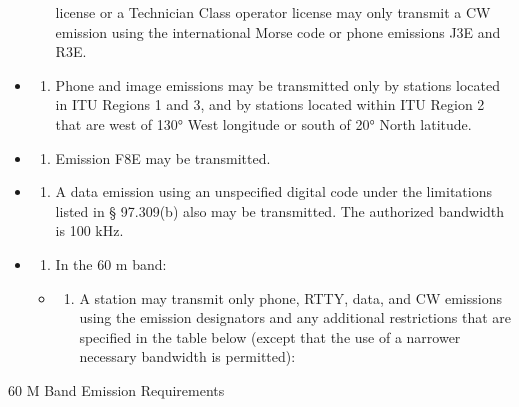 \documentclass[
  letterpaper,
  DIV=11,
  numbers=noendperiod]{scrreport}
\providecommand{\tightlist}{%
  \setlength{\itemsep}{0pt}\setlength{\parskip}{0pt}}\usepackage{longtable,booktabs,array}
\begin{document}
\begin{itemize}
\begin{enumerate}
    license or a Technician Class operator license may only transmit a
    CW emission using the international Morse code or phone emissions
    J3E and R3E.
  \end{enumerate}
\item
  \begin{enumerate}
  \def\labelenumi{(\arabic{enumi})}
  \setcounter{enumi}{10}
  \tightlist
  \item
    Phone and image emissions may be transmitted only by stations
    located in ITU Regions 1 and 3, and by stations located within ITU
    Region 2 that are west of 130° West longitude or south of 20° North
    latitude.
  \end{enumerate}
\item
  \begin{enumerate}
  \def\labelenumi{(\arabic{enumi})}
  \setcounter{enumi}{11}
  \tightlist
  \item
    Emission F8E may be transmitted.
  \end{enumerate}
\item
  \begin{enumerate}
  \def\labelenumi{(\arabic{enumi})}
  \setcounter{enumi}{12}
  \tightlist
  \item
    A data emission using an unspecified digital code under the
    limitations listed in § 97.309(b) also may be transmitted. The
    authorized bandwidth is 100 kHz.
  \end{enumerate}
\item
  \begin{enumerate}
  \def\labelenumi{(\arabic{enumi})}
  \setcounter{enumi}{13}
  \tightlist
  \item
    In the 60 m band:
  \end{enumerate}

  \begin{itemize}
  \item
    \begin{enumerate}
    \def\labelenumi{(\roman{enumi})}
    \tightlist
    \item
      A station may transmit only phone, RTTY, data, and CW emissions
      using the emission designators and any additional restrictions
      that are specified in the table below (except that the use of a
      narrower necessary bandwidth is permitted):
    \end{enumerate}
  \end{itemize}
\end{itemize}

60 M Band Emission Requirements
\end{document}
